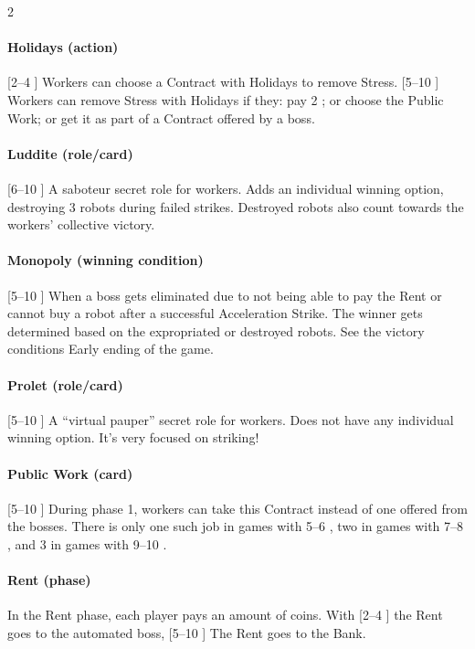 \begin{multicols}{2}
        \paragraph{Holidays (action)}
            [2–4 \faPeopleGroup] Workers can choose a Contract with Holidays to
            remove Stress. [5–10 \faPeopleGroup] Workers can remove Stress with Holidays if they: pay
            2 \faRubleSign; or choose the Public Work; or get it as part of a Contract offered by a boss.
        
        \paragraph{Luddite (role/card)}
            [6–10 \faPeopleGroup] A saboteur secret role for workers. Adds an individual
            winning option, destroying 3 robots during failed strikes. Destroyed robots
            also count towards the workers' collective victory.
        
        \paragraph{Monopoly (winning condition)}
            [5–10 \faPeopleGroup] When a boss gets eliminated due to
            not being able to pay the Rent or cannot buy a robot after a successful Acceleration
            Strike. The winner gets determined based on the expropriated or destroyed
            robots. See the victory conditions Early ending of the game.
        
        \paragraph{Prolet (role/card)}
            [5–10 \faPeopleGroup] A “virtual pauper” secret role for workers. Does not
            have any individual winning option. It's very focused on striking!
        
        \paragraph{Public Work (card)}
            [5–10 \faPeopleGroup] During phase 1, workers can take this Contract
            instead of one offered from the bosses. There is only one such job in games with
            5–6 \faPeopleGroup, two in games with 7–8 \faPeopleGroup, and 3 in games with 9–10 \faPeopleGroup.
        
        \paragraph{Rent (phase)}
            In the Rent phase, each player pays an amount of coins. With [2–4
            \faPeopleGroup] the Rent goes to the automated boss, [5–10 \faPeopleGroup] The Rent goes to the Bank.
        

\end{multicols}
